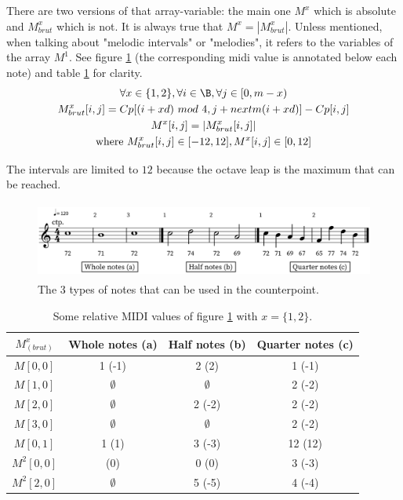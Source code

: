 There are two versions of that array-variable: the main one $M^x$ which is absolute and $M^x_{brut}$ which is not. It is always true that $M^x = \left|M^x_{brut}\right|$. Unless mentioned, when talking about "melodic intervals" or "melodies", it refers to the variables of the array $M^1$. See figure \ref{fig:threetypesofnotes} (the corresponding midi value is annotated below each note) and table \ref{tab:mxarrayvar} for clarity.
\begin{equation}
    \begin{gathered}
        \forall x \in \{1, 2\}, \forall i \in \B, \forall j \in [0, m-x)\\
        M^x_{brut}[i, j] = Cp[(i+xd)\ mod\ 4, j+nextm(i+xd)] - Cp[i, j]\\
        M^x[i, j] = \left|M^x_{brut}[i, j]\right|\\
        \text{where } M^x_{brut}[i, j] \in [-12, 12], M^x[i, j] \in [0, 12]
    \end{gathered}
\end{equation}

The intervals are limited to $12$ because the octave leap is the maximum that can be reached.

\begin{figure}[h]
    \centering
    \includegraphics[height=1in]{Images/melodic_intervals_variables.png}
    \caption{The 3 types of notes that can be used in the counterpoint.}
    \label{fig:threetypesofnotes}
\end{figure}

\begin{table}[h]
    \centering
    \begin{tabular}{|c|||c||c||c|}
    \hline
    $M^x_{(brut)}$      & Whole notes (a) & Half notes (b) & Quarter notes (c) \\ \hline \hline
    $M[0, 0]$   & 1 (-1)        & 2 (2)          & 1 (-1)            \\ \hline
    $M[1, 0]$   & $\emptyset$   & $\emptyset$    & 2 (-2)            \\ \hline
    $M[2, 0]$   & $\emptyset$   & 2 (-2)         & 2 (-2)            \\ \hline
    $M[3, 0]$   & $\emptyset$   & $\emptyset$    & 2 (-2)            \\ \hline
    $M[0, 1]$   & 1 (1)         & 3 (-3)         & 12 (12)            \\ \hline
    $M^2[0, 0]$ & (0)           & 0 (0)          & 3 (-3)            \\ \hline
    $M^2[2, 0]$ & $\emptyset$   & 5 (-5)         & 4 (-4)            \\ \hline
    \end{tabular}
    \caption{Some relative MIDI values of figure \ref{fig:threetypesofnotes} with $x=\{1, 2\}$.}
    \label{tab:mxarrayvar}
\end{table}

